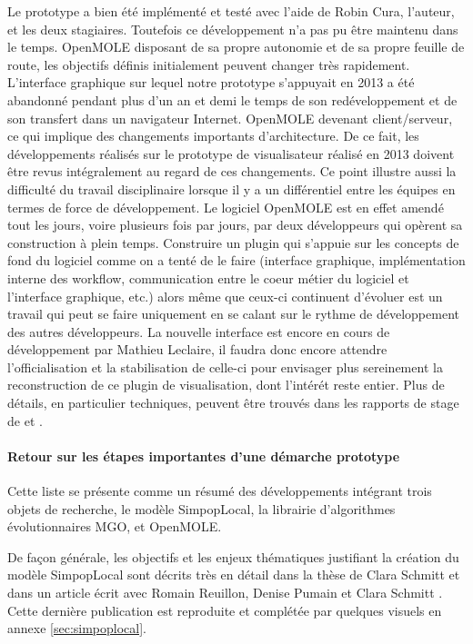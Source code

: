 Le prototype a bien été implémenté et testé avec l'aide de Robin Cura, l'auteur, et les deux stagiaires. Toutefois ce développement n'a pas pu être maintenu dans le temps. OpenMOLE disposant de sa propre autonomie et de sa propre feuille de route, les objectifs définis initialement peuvent changer très rapidement. L'interface graphique sur lequel notre prototype s'appuyait en 2013 a été abandonné pendant plus d'un an et demi le temps de son redéveloppement et de son transfert dans un navigateur Internet. OpenMOLE devenant client/serveur, ce qui implique des changements importants d'architecture. De ce fait, les développements réalisés sur le prototype de visualisateur réalisé en 2013 doivent être revus intégralement au regard de ces changements. Ce point illustre aussi la difficulté du travail disciplinaire lorsque il y a un différentiel entre les équipes en termes de force de développement. Le logiciel OpenMOLE est en effet amendé tout les jours, voire plusieurs fois par jours, par deux développeurs qui opèrent sa construction à plein temps. Construire un plugin qui s'appuie sur les concepts de fond du logiciel comme on a tenté de le faire (interface graphique, implémentation interne des workflow, communication entre le coeur métier du logiciel et l'interface graphique, etc.) alors même que ceux-ci continuent d'évoluer est un travail qui peut se faire uniquement en se calant sur le rythme de développement des autres développeurs. La nouvelle interface est encore en cours de développement par Mathieu Leclaire, il faudra donc encore attendre l'officialisation et la stabilisation de celle-ci pour envisager plus sereinement la reconstruction de ce plugin de visualisation, dont l'intérét reste entier. Plus de détails, en particulier techniques, peuvent être trouvés dans les rapports de stage de \textcite{Bernard2013} et \textcite{Jayet2013}.

\paragraph {Retour sur les étapes importantes d'une démarche prototype}


Cette liste se présente comme un résumé des développements intégrant trois objets de recherche, le modèle SimpopLocal, la librairie d'algorithmes évolutionnaires MGO, et OpenMOLE.

De façon générale, les objectifs et les enjeux thématiques justifiant la création du modèle SimpopLocal sont décrits très en détail dans la thèse de Clara Schmitt \autocite{Schmitt2014} et dans un article écrit avec Romain Reuillon, Denise Pumain et Clara Schmitt \autocite{Schmitt2015}. Cette dernière publication est reproduite et complétée par quelques visuels en annexe \ref{sec:simpoplocal}.

